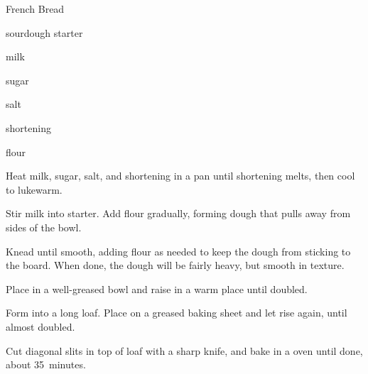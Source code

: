 \begin{recipe}{French Bread}{}{}

\begin{ingredients}
\item {} sourdough starter
\item \C{\half} milk
\item \Tp{1\eighth} sugar
\item \tp{2\quarter} salt
\item \C{\eighth} shortening 
\item \C{1\twothird} flour
\end{ingredients}

\begin{directions}

\item Heat milk, sugar, salt, and shortening in a pan until shortening melts, then cool to lukewarm.

\item Stir milk into starter. Add flour gradually, forming dough that pulls away from sides of the bowl.

\item Knead until smooth, adding flour as needed to keep the dough from sticking to the board. When done, the dough will be fairly heavy, but smooth in texture.

\item Place in a well-greased bowl and raise in a warm place until doubled.

\item Form into a long loaf. Place on a greased baking sheet and let rise again, until almost doubled.

\item Cut diagonal slits in top of loaf with a sharp knife, and bake in a  oven until done, about 35~minutes.

\end{directions}
\end{recipe}
